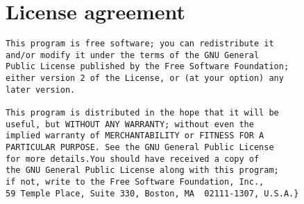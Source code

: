 \documentclass[twoside,11pt]{article}
\newcommand{\xlabel}[1]{}
\renewcommand{\_}{\texttt{\symbol{95}}}
\begin{document}
\section{License agreement\xlabel{gpl_license}}

\begin{verbatim}
This program is free software; you can redistribute it
and/or modify it under the terms of the GNU General
Public License published by the Free Software Foundation;
either version 2 of the License, or (at your option) any
later version.

This program is distributed in the hope that it will be
useful, but WITHOUT ANY WARRANTY; without even the
implied warranty of MERCHANTABILITY or FITNESS FOR A
PARTICULAR PURPOSE. See the GNU General Public License
for more details.You should have received a copy of
the GNU General Public License along with this program;
if not, write to the Free Software Foundation, Inc.,
59 Temple Place, Suite 330, Boston, MA  02111-1307, U.S.A.}
\end{verbatim}
\end{document}
